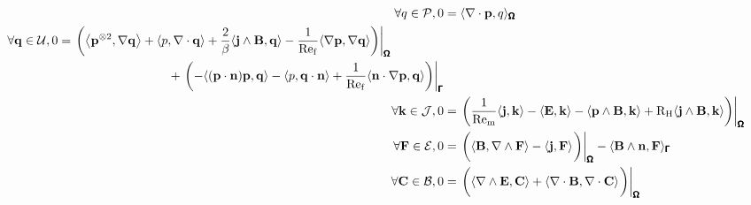     \begin{align}
        \forall q \in \calP,  0  &=  \langle\nabla\cdot\bfp, q\rangle_{\bfOmega}  \\
        \begin{split}
            \forall \bfq \in \calU,  0  &=  \left.\left(\left\langle\bfp^{\otimes 2}, \nabla\bfq\right\rangle + \langle p, \nabla\cdot\bfq\rangle + \frac{2}{\beta}\langle\bfj\wedge\bfB, \bfq\rangle - \frac{1}{\rmRef}\langle\nabla\bfp, \nabla\bfq\rangle\right)\right|_{\bfOmega}  \\
            &\;\;\;\;\;\;\;\;\;\;\;\;\;\;\;\;\;\;\;\;\;\;\;\;\;\;\;\;\;\;\;\;  + \left.\left(- \langle(\bfp\cdot\bfn)\bfp, \bfq\rangle - \langle p, \bfq\cdot\bfn\rangle + \frac{1}{\rmRef}\langle\bfn\cdot\nabla\bfp, \bfq\rangle\right)\right|_{\bfGamma}
        \end{split}  \\
        \forall \bfk \in \calJ,  0  &=  \left.\left(\frac{1}{\rmRem}\langle\bfj, \bfk\rangle - \langle\bfE, \bfk\rangle - \langle\bfp\wedge\bfB, \bfk\rangle + \rmRH\langle\bfj\wedge\bfB, \bfk\rangle\right)\right|_{\bfOmega}  \\
        \forall \bfF \in \calE,  0  &=  \left.\left(\langle\bfB, \nabla\wedge\bfF\rangle - \langle\bfj, \bfF\rangle\tall\right)\right|_{\bfOmega} - \langle\bfB\wedge\bfn, \bfF\rangle_{\bfGamma}  \\
        \forall \bfC \in \calB,  0  &=  \left.\left(\langle\nabla\wedge\bfE, \bfC\rangle + \langle\nabla\cdot\bfB, \nabla\cdot\bfC\rangle\tall\right)\right|_{\bfOmega}
    \end{align}

